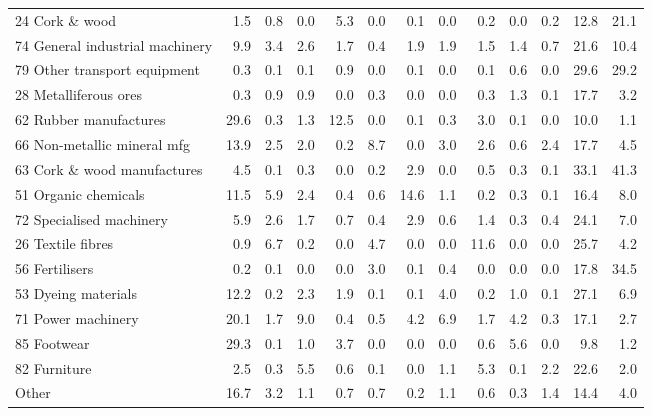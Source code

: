 \begin{tabular}{lrrrrrrrrrrrr}
24 Cork \& wood & 1.5 & 0.8 & 0.0 & 5.3 & 0.0 & 0.1 & 0.0 & 0.2 & 0.0 & 0.2 & 12.8 & 21.1 \\
74 General industrial machinery & 9.9 & 3.4 & 2.6 & 1.7 & 0.4 & 1.9 & 1.9 & 1.5 & 1.4 & 0.7 & 21.6 & 10.4 \\
79 Other transport equipment & 0.3 & 0.1 & 0.1 & 0.9 & 0.0 & 0.1 & 0.0 & 0.1 & 0.6 & 0.0 & 29.6 & 29.2 \\
28 Metalliferous ores & 0.3 & 0.9 & 0.9 & 0.0 & 0.3 & 0.0 & 0.0 & 0.3 & 1.3 & 0.1 & 17.7 & 3.2 \\
62 Rubber manufactures & 29.6 & 0.3 & 1.3 & 12.5 & 0.0 & 0.1 & 0.3 & 3.0 & 0.1 & 0.0 & 10.0 & 1.1 \\
66 Non-metallic mineral mfg & 13.9 & 2.5 & 2.0 & 0.2 & 8.7 & 0.0 & 3.0 & 2.6 & 0.6 & 2.4 & 17.7 & 4.5 \\
63 Cork \& wood manufactures & 4.5 & 0.1 & 0.3 & 0.0 & 0.2 & 2.9 & 0.0 & 0.5 & 0.3 & 0.1 & 33.1 & 41.3 \\
51 Organic chemicals & 11.5 & 5.9 & 2.4 & 0.4 & 0.6 & 14.6 & 1.1 & 0.2 & 0.3 & 0.1 & 16.4 & 8.0 \\
72 Specialised machinery & 5.9 & 2.6 & 1.7 & 0.7 & 0.4 & 2.9 & 0.6 & 1.4 & 0.3 & 0.4 & 24.1 & 7.0 \\
26 Textile fibres & 0.9 & 6.7 & 0.2 & 0.0 & 4.7 & 0.0 & 0.0 & 11.6 & 0.0 & 0.0 & 25.7 & 4.2 \\
56 Fertilisers & 0.2 & 0.1 & 0.0 & 0.0 & 3.0 & 0.1 & 0.4 & 0.0 & 0.0 & 0.0 & 17.8 & 34.5 \\
53 Dyeing materials & 12.2 & 0.2 & 2.3 & 1.9 & 0.1 & 0.1 & 4.0 & 0.2 & 1.0 & 0.1 & 27.1 & 6.9 \\
71 Power machinery & 20.1 & 1.7 & 9.0 & 0.4 & 0.5 & 4.2 & 6.9 & 1.7 & 4.2 & 0.3 & 17.1 & 2.7 \\
85 Footwear & 29.3 & 0.1 & 1.0 & 3.7 & 0.0 & 0.0 & 0.0 & 0.6 & 5.6 & 0.0 & 9.8 & 1.2 \\
82 Furniture & 2.5 & 0.3 & 5.5 & 0.6 & 0.1 & 0.0 & 1.1 & 5.3 & 0.1 & 2.2 & 22.6 & 2.0 \\
Other & 16.7 & 3.2 & 1.1 & 0.7 & 0.7 & 0.2 & 1.1 & 0.6 & 0.3 & 1.4 & 14.4 & 4.0 \\
\bottomrule
\end{tabular}
